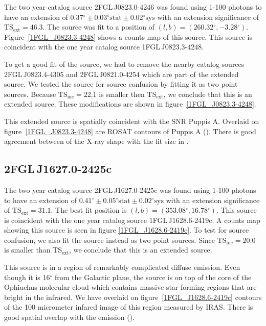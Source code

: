 \documentclass[12pt,preprint]{aastex}
\newcommand{\gev}{\text{GeV}\xspace}
\newcommand{\tsext}{{\ensuremath{\text{TS}_{\text{ext}}}}\xspace}
\newcommand{\tsinc}{\ensuremath{\text{TS}_{\text{inc}}}\xspace}
\newcommand{\sys}{\text{sys}\xspace}
\newcommand{\stat}{\text{stat}\xspace}
\renewcommand{\deg}{\ensuremath{^\circ}\xspace}
\begin{document}

The two year catalog source 2FGL\,J0823.0-4246 was found 
using 1-100 \gev photons to have an 
extension of $0.37\deg\pm0.03\deg\stat\pm0.02\deg\sys$ 
with an extension
significance of $\tsext=46.3$.  The source was fit to a position of
$(l,b)=(260.32\deg,-3.28\deg)$.  Figure~\ref{1FGL_J0823.3-4248} shows a
counts map of this source.  This source is coincident with the one year
catalog source 1FGL\,J0823.3-4248.

To get a good fit of the source, we had to remove the nearby catalog
sources 2FGL\,J0823.4-4305 and 2FGL\,J0821.0-4254 which are part of the
extended source.  We tested the source for source confusion by fitting
it as two point sources. Because $\tsinc=22.1$ is smaller then \tsext,
we conclude that this is an extended source.  These modifications are
shown in figure~\ref{1FGL_J0823.3-4248}.

This extended source is spatially coincident with the SNR Puppis A.
Overlaid on figure~\ref{1FGL_J0823.3-4248} are ROSAT contours of Puppis
A (\cite{rosat_puppis_a}). There is good agreement between of the X-ray
shape with the fit size in \gev.


\subsection{2FGL\,J1627.0-2425c}
\label{section_2FGL_J1627.0-2425c}


The two year catalog source 2FGL\,J1627.0-2425c was found 
using 1-100 \gev photons to have an 
extension of $0.41\deg\pm0.05\deg\stat\pm0.02\deg\sys$ 
with an extension significance of $\tsext=31.1$. 
The best fit position is $(l,b)=(353.08\deg, 16.78\deg)$.
This source is coincident with the one year catalog source 1FGL\,J1628.6-2419c.
A counts map showing this source is
seen in figure \ref{1FGL_J1628.6-2419c}.  To test for source confusion,
we also fit the source instead as two point sources. Since $\tsinc=20.0$
is smaller than \tsext, we conclude that this is an extended source.

This source is in a region of remarkably complicated diffuse emission.
Even though it is 16\deg from the Galactic plane, the source is on top
of the core of the Ophiuchus molecular cloud which contains massive
star-forming regions that are bright in the infrared.  We have overlaid
on figure~\ref{1FGL_J1628.6-2419c} contours of the 100 micrometer infared
image of this region measured by IRAS. There is good spatial overlap
with the \gev emission (\cite{iras_rho_ophiuci}).
\end{document}
